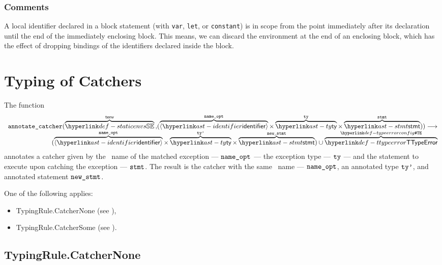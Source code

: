 \subsection{Comments}
A local identifier declared in a block statement (with \texttt{var}, \texttt{let}, or \texttt{constant})
is in scope from the point immediately after its declaration until the end of the
immediately enclosing block. This means, we can discard the environment at the end of
an enclosing block, which has the effect of dropping bindings of the identifiers declared inside the block.


\chapter{Typing of Catchers}
\hypertarget{def-annotatecatcher}{}
The function
\[
\begin{array}{r}
  \annotatecatcher{
    \overname{\staticenvs}{\tenv} \aslsep
    (\overname{\langle\identifier\rangle}{\nameopt} \times \overname{\ty}{\tty} \times \overname{\stmt}{\vstmt})
  } \aslto \\
  (\overname{\langle\identifier\rangle}{\nameopt} \times \overname{\ty}{\ttyp} \times \overname{\stmt}{\newstmt})
  \cup \overname{\TTypeError}{\TypeErrorConfig}
\end{array}
\]
annotates a catcher given by the \optional\ name of the matched exception --- $\texttt{name\_opt}$ ---
the exception type --- $\texttt{ty}$ --- and the statement to execute upon catching the exception --- $\texttt{stmt}$.
The result is the catcher with the same \optional\ name --- $\texttt{name\_opt}$, an annotated type $\texttt{ty'}$, and annotated statement $\texttt{new\_stmt}$.
\ProseOtherwiseTypeError

One of the following applies:
\begin{itemize}
\item TypingRule.CatcherNone (see ),
\item TypingRule.CatcherSome (see ).
\end{itemize}

\section{TypingRule.CatcherNone \label{sec:TypingRule.CatcherNone}}

